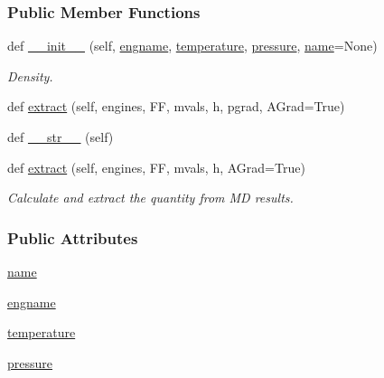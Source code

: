 \subsubsection*{Public Member Functions}
\begin{DoxyCompactItemize}
\item 
def \hyperlink{classsrc_1_1quantity_1_1Quantity__Density_a3617128156e70ea31632f9461d30e1e5}{\+\_\+\+\_\+init\+\_\+\+\_\+} (self, \hyperlink{classsrc_1_1quantity_1_1Quantity__Density_a0b13b8f280f43796654c62a9717799ad}{engname}, \hyperlink{classsrc_1_1quantity_1_1Quantity_a1f54d5969bb33f67e72bc9ff8c7d6b68}{temperature}, \hyperlink{classsrc_1_1quantity_1_1Quantity_adf325119dc5139a5d664707336bc2e65}{pressure}, \hyperlink{classsrc_1_1quantity_1_1Quantity__Density_a88e34de9cb78018a62ba45865c593c75}{name}=None)
\begin{DoxyCompactList}\small\item\em Density. \end{DoxyCompactList}\item 
def \hyperlink{classsrc_1_1quantity_1_1Quantity__Density_aca32f2422b4082a57fbd5030d66dec6c}{extract} (self, engines, FF, mvals, h, pgrad, A\+Grad=True)
\item 
def \hyperlink{classsrc_1_1quantity_1_1Quantity_a75f05aea06603e7830b17c4fb4f5264f}{\+\_\+\+\_\+str\+\_\+\+\_\+} (self)
\item 
def \hyperlink{classsrc_1_1quantity_1_1Quantity_a31f14fa77a8312030e07f3be4b797dec}{extract} (self, engines, FF, mvals, h, A\+Grad=True)
\begin{DoxyCompactList}\small\item\em Calculate and extract the quantity from MD results. \end{DoxyCompactList}\end{DoxyCompactItemize}
\subsubsection*{Public Attributes}
\begin{DoxyCompactItemize}
\item 
\hyperlink{classsrc_1_1quantity_1_1Quantity__Density_a88e34de9cb78018a62ba45865c593c75}{name}
\item 
\hyperlink{classsrc_1_1quantity_1_1Quantity__Density_a0b13b8f280f43796654c62a9717799ad}{engname}
\item 
\hyperlink{classsrc_1_1quantity_1_1Quantity_a1f54d5969bb33f67e72bc9ff8c7d6b68}{temperature}
\item 
\hyperlink{classsrc_1_1quantity_1_1Quantity_adf325119dc5139a5d664707336bc2e65}{pressure}
\end{DoxyCompactItemize}


